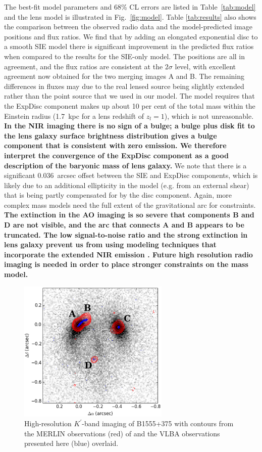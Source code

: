\documentclass[a4paper,fleqn,usenatbib,useAMS]{mnras}
\begin{document}
The best-fit model parameters and 68\% CL errors are listed in Table~\ref{tab:model} and the lens model is illustrated in Fig.~\ref{fig:model}. Table \ref{tab:results} also shows the comparison between the observed radio data and the model-predicted image positions and flux ratios. We find that by adding an elongated exponential disc to a smooth SIE model there is significant improvement in the predicted flux ratios when compared to the results for the SIE-only model. 
The positions are all in agreement, and the flux ratios are consistent at the $2\sigma$ level, with excellent agreement now obtained for the two merging images A and B. The remaining differences in fluxes may due to the real lensed source being slightly extended rather than the point source that we used in our model. The model requires that the ExpDisc component makes up about 10 per cent of the total mass within the Einstein radius (1.7~kpc for a lens redshift of $z_l = 1$), which is not unreasonable.  {\bf In the NIR imaging there is no sign of a bulge; a bulge plus disk fit to the lens galaxy surface brightness distribution gives a bulge component that is consistent with zero emission.  We therefore interpret the convergence of the ExpDisc component as a good description of the baryonic mass of lens galaxy.}  We note that there is a significant 0.036~arcsec offset between the SIE and ExpDisc components, which is likely due to an additional ellipticity in the model (e.g. from an external shear) that is being partly compensated for by the disc component. Again, more complex mass models need the full extent of the gravitational arc for constraints. {\bf The extinction in the AO imaging is so severe that components B and D are not visible, and the arc that connects A and B appears to be truncated.  The low signal-to-noise ratio and the strong extinction in lens galaxy prevent us from using modeling techniques that incorporate the extended NIR emission \citep[e.g.][]{V12}.  Future high resolution radio imaging is needed in order to place stronger constraints on the mass model.}

\begin{figure}
\includegraphics[width=72mm]{fig2_twocontour_b.eps}
\caption{High-resolution $K^\prime$-band imaging of B1555+375 with contours from the MERLIN observations (red) of \citet{Marlow99} and the VLBA observations presented here (blue) overlaid.}
\label{fig:merlin}
\end{figure}
\end{document}

